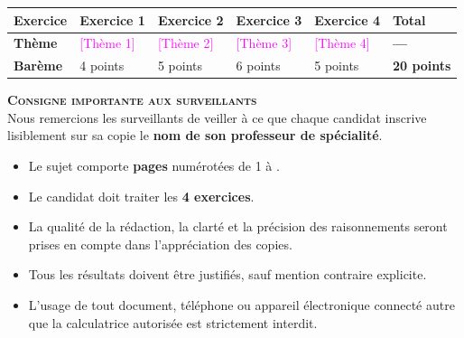 \documentclass[12pt,a4paper]{article}
\newcommand{\ph}[1]{\ifmmode\text{\color{magenta}[#1]}\else\textcolor{magenta}{[#1]}\fi}
\begin{document}
\vfill

\begin{center}
\renewcommand{\arraystretch}{1.5}
\begin{tabularx}{0.96\textwidth}{|>{\centering\arraybackslash\bfseries}m{2.6cm}|*{4}{Y|}>{\centering\arraybackslash\bfseries}m{2.2cm}|}
    \hline
    Exercice & \textbf{Exercice 1} & \textbf{Exercice 2} & \textbf{Exercice 3} & \textbf{Exercice 4} & \textbf{Total} \\ \hline
    Thème    & \ph{Thème 1} & \ph{Thème 2} & \ph{Thème 3} & \ph{Thème 4} & --- \\ \hline
    Barème   & 4 points & 5 points & 6 points & 5 points & 20 points \\ \hline
\end{tabularx}
\end{center}

\vfill

\begin{center}
\begin{tcolorbox}[colback=gray!5, colframe=black, boxrule=1pt, arc=1mm, width=0.96\textwidth, top=3mm, bottom=3mm, left=4mm, right=4mm]
    \centering
    \textbf{\textsc{Consigne importante aux surveillants}}\\[0.15cm]
    \normalsize
    Nous remercions les surveillants de veiller à ce que chaque candidat inscrive lisiblement sur sa copie le \textbf{nom de son professeur de spécialité}.
\end{tcolorbox}
\end{center}

\vfill

\begin{tcolorbox}[colback=white, colframe=black, arc=0mm, boxrule=0.8pt, title=\textbf{\textsc{Consignes aux candidats}}, coltitle=black, colbacktitle=gray!15, top=3mm, bottom=3mm, left=4mm, right=4mm]
    \small
    \begin{itemize}[leftmargin=1.5em, itemsep=0.25em, label=---]
        \item Le sujet comporte \textbf{\pageref{LastPage} pages} numérotées de 1 à \pageref{LastPage}.
        \item Le candidat doit traiter les \textbf{4 exercices}.
        \item La qualité de la rédaction, la clarté et la précision des raisonnements seront prises en compte dans l'appréciation des copies.
        \item Tous les résultats doivent être justifiés, sauf mention contraire explicite.
        \item L'usage de tout document, téléphone ou appareil électronique connecté autre que la calculatrice autorisée est strictement interdit.
    \end{itemize}
\end{tcolorbox}
\end{document}
